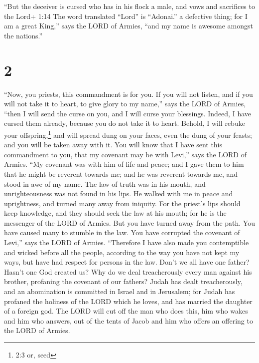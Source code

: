  ``But the deceiver is cursed who has in his flock a male,
and vows and sacrifices to the Lord+ 1:14 The word translated ``Lord''
is ``Adonai.'' a defective thing; for I am a great King,'' says the LORD
of Armies, ``and my name is awesome amongst the nations.''

\hypertarget{section-1}{%
\section{2}\label{section-1}}

 ``Now, you priests, this commandment is for you.
 If you will not listen, and if you will not take it to
heart, to give glory to my name,'' says the LORD of Armies, ``then I
will send the curse on you, and I will curse your blessings. Indeed, I
have cursed them already, because you do not take it to heart.
 Behold, I will rebuke your offspring,\footnote{2:3 or, seed}
and will spread dung on your faces, even the dung of your feasts; and
you will be taken away with it.  You will know that I have
sent this commandment to you, that my covenant may be with Levi,'' says
the LORD of Armies.  ``My covenant was with him of life and
peace; and I gave them to him that he might be reverent towards me; and
he was reverent towards me, and stood in awe of my name. 
The law of truth was in his mouth, and unrighteousness was not found in
his lips. He walked with me in peace and uprightness, and turned many
away from iniquity.  For the priest's lips should keep
knowledge, and they should seek the law at his mouth; for he is the
messenger of the LORD of Armies.  But you have turned away
from the path. You have caused many to stumble in the law. You have
corrupted the covenant of Levi,'' says the LORD of Armies. 
``Therefore I have also made you contemptible and wicked before all the
people, according to the way you have not kept my ways, but have had
respect for persons in the law.  Don't we all have one
father? Hasn't one God created us? Why do we deal treacherously every
man against his brother, profaning the covenant of our fathers?
 Judah has dealt treacherously, and an abomination is
committed in Israel and in Jerusalem; for Judah has profaned the
holiness of the LORD which he loves, and has married the daughter of a
foreign god.  The LORD will cut off the man who does this,
him who wakes and him who answers, out of the tents of Jacob and him who
offers an offering to the LORD of Armies.

